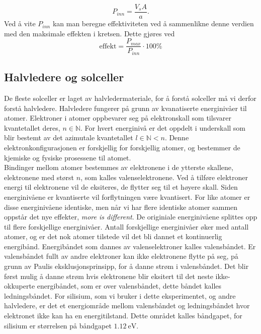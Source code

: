 \documentclass[%
 reprint,
 amsmath,amssymb,
 aps,
 norsk,
 booktabs
]{revtex4-1}
\begin{document}
\begin{equation}
  P_{inn} = \frac{V_sA}{a} \label{kalibrering}.
\end{equation}
Ved å vite $P_{inn}$ kan man beregne effektiviteten ved å sammenlikne denne verdien med den maksimale effekten i kretsen. Dette gjøres ved
\begin{equation}
  \text{effekt} = \frac{P_{max}}{P_{inn}}\cdot 100\%\label{effekt}
\end{equation}
\subsection{Halvledere og solceller}
De fleste solceller er laget av halvledermateriale, for å forstå solceller må vi derfor forstå halvledere. Halvledere fungerer på grunn av kvanatiserte energinivåer til atomer. Elektroner i atomer oppbevarer seg på elektronskall som tilsvarer kvantetallet deres, $n\in\mathbb{N}$. For hvert energinivå er det oppdelt i underskall som blir bestemt av det azimutale kvantetallet $l \in \mathbb{N} < n$. Denne elektronkonfigurasjonen er forskjellig for forskjellig atomer, og bestemmer de kjemiske og fysiske prosessene til atomet.\\
Bindinger mellom atomer bestemmes av elektronene i de ytterste skallene, elektronene med størst $n$, som kalles valenselektronene. Ved å tilføre elektroner energi til elektronene vil de eksiteres, de flytter seg til et høyere skall. Siden energinivåene er kvantiserte vil forflytningen være kvantisert. For like atomer er disse energinivåene identiske, men når vi har flere identiske atomer sammen oppstår det nye effekter, \textit{more is different}. De originiale energinivåene splittes opp til flere forskjellige energinivåer. Antall forskjellige energinivåer øker med antall atomer, og er det nok atomer tilstede vil det bli dannet et kontinuerlig energibånd. Energibåndet som dannes av valenselektroner kalles valensbåndet. Er valensbåndet fullt av andre elektroner kan ikke elektronene flytte på seg, på grunn av Paulis eksklusjonsprinsipp, for å danne strøm i valensbåndet. Det blir først mulig å danne strøm hvis elektronene blir eksitert til det neste ikke-okkuperte energibåndet, som er over valensbåndet, dette båndet kalles ledningsbåndet. For silisium, som vi bruker i dette eksperimentet, og andre halvledere, er det et energiområde mellom valensbåndet og ledningsbåndet hvor elektronet ikke kan ha en energitilstand. Dette området kalles båndgapet, for silisium er størrelsen på båndgapet $\SI{1.12}{\electronvolt}$.\par
\end{document}
